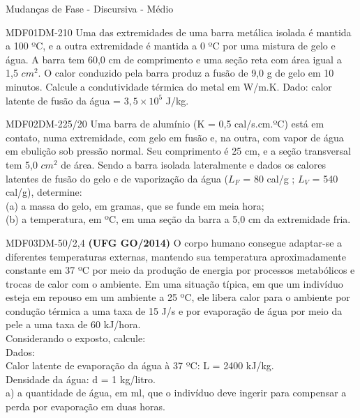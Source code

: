 \documentclass[12pt]{article}
\begin{document}
	\begin{quiz}{Mudanças de Fase - Discursiva - Médio}
		\begin{essay}[points=2,penalty=0,response format=file,attachments allowed=1,attachments required=1]{MDF01DM-210}
			Uma das extremidades de uma barra metálica isolada é mantida a 100 ºC, e a outra extremidade é mantida a 0 ºC por uma mistura de gelo e água. A barra tem 60,0 cm de comprimento e uma seção reta com área igual a 1,5 $cm^{2}$. O calor conduzido pela barra produz a fusão de 9,0 g de gelo em 10 minutos. Calcule a condutividade térmica do metal em W/m.K.
			Dado: calor latente de fusão da água = $3,5\times10^{5}$ J/kg.				
		\end{essay}	
		\begin{essay}[points=2,penalty=0,response format=file,attachments allowed=1,attachments required=1]{MDF02DM-225/20}
			Uma barra de alumínio (K = 0,5 cal/s.cm.ºC) está em contato, numa extremidade, com gelo em fusão e, na outra, com vapor de água em ebulição sob pressão normal. Seu comprimento é 25 cm, e a seção transversal tem 5,0 $cm^{2}$ de área. Sendo a barra isolada lateralmente e dados os calores latentes de fusão do gelo e de vaporização da água ($L_{F}$ = 80 cal/g ; $L_{V}$ = 540 cal/g), determine:\\ 
			(a)	a massa do gelo, em gramas, que se funde em meia hora;\\
			(b)	a temperatura, em ºC, em uma seção da barra a 5,0 cm da extremidade fria.			
		\end{essay}
		\begin{essay}[points=2,penalty=0,response format=file,attachments allowed=1,attachments required=1]{MDF03DM-50/2,4}
			\textbf{(UFG GO/2014)} O corpo humano consegue adaptar-se a diferentes temperaturas externas, mantendo sua temperatura aproximadamente constante em 37 ºC por meio da produção de energia por processos metabólicos e trocas de calor com o ambiente. Em uma situação típica, em que um indivíduo esteja em repouso em um ambiente a 25 ºC, ele libera calor para o ambiente por condução térmica a uma taxa de 15 J/s e por evaporação de água por meio da pele a uma taxa de 60 kJ/hora.\\			
			Considerando o exposto, calcule:\\
			Dados:\\
			Calor latente de evaporação da água à 37 ºC: L = 2400 kJ/kg.\\
			Densidade da água: d = 1 kg/litro.\\				
			a)	a quantidade de água, em ml, que o indivíduo deve ingerir para compensar a perda por evaporação em duas horas.\\

\end{essay}
\end{quiz}
\end{document}
